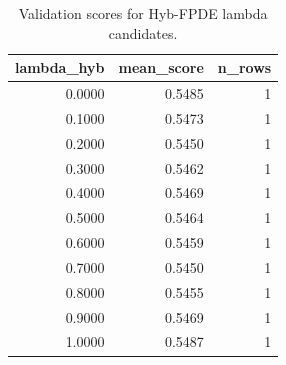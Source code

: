 \begin{table}[t]
\caption{Validation scores for Hyb-FPDE lambda candidates.}
\label{tab:lambda_distribution_computed}
\centering
\begin{tabular}{rrr}
\toprule
lambda\_hyb & mean\_score & n\_rows \\
\midrule
0.0000 & 0.5485 & 1 \\
0.1000 & 0.5473 & 1 \\
0.2000 & 0.5450 & 1 \\
0.3000 & 0.5462 & 1 \\
0.4000 & 0.5469 & 1 \\
0.5000 & 0.5464 & 1 \\
0.6000 & 0.5459 & 1 \\
0.7000 & 0.5450 & 1 \\
0.8000 & 0.5455 & 1 \\
0.9000 & 0.5469 & 1 \\
1.0000 & 0.5487 & 1 \\
\bottomrule
\end{tabular}

\end{table}
